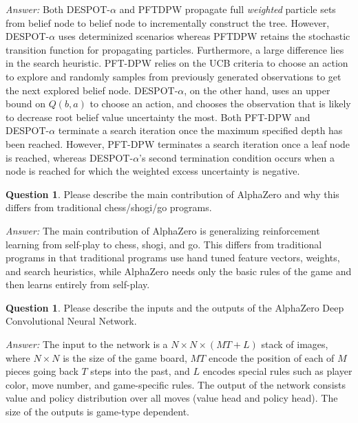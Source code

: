 \documentclass{article}
\theoremstyle{definition}
\newtheorem{question}[thm]{Question}
\newenvironment{answer}{\noindent\textit{Answer:}}{}
\begin{document}
\begin{answer}
Both DESPOT-$\alpha$ and PFTDPW propagate full \emph{weighted} particle sets from belief node to belief node to incrementally construct the tree. However, DESPOT-$\alpha$ uses determinized scenarios whereas PFTDPW retains the stochastic transition function for propagating particles. Furthermore, a large difference lies in the search heuristic. PFT-DPW relies on the UCB criteria to choose an action to explore and randomly samples from previously generated observations to get the next explored belief node. DESPOT-$\alpha$, on the other hand, uses an upper bound on $Q(b,a)$ to choose an action, and chooses the observation that is likely to decrease root belief value uncertainty the most. Both PFT-DPW and DESPOT-$\alpha$ terminate a search iteration once the maximum specified depth has been reached. However, PFT-DPW terminates a search iteration once a leaf node is reached, whereas DESPOT-$\alpha$'s second termination condition occurs when a node is reached for which the weighted excess uncertainty is negative.
\end{answer}

\begin{question}
Please describe the main contribution of AlphaZero and why this differs from traditional chess/shogi/go programs.
\end{question}

\begin{answer}
The main contribution of AlphaZero is generalizing reinforcement learning from self-play to chess, shogi, and go. This differs from traditional programs in that traditional programs use hand tuned feature vectors, weights, and search heuristics, while AlphaZero needs only the basic rules of the game and then learns entirely from self-play.
\end{answer}

\begin{question}
Please describe the inputs and the outputs of the AlphaZero Deep Convolutional Neural Network.
\end{question}

\begin{answer}
The input to the network is a $N \times N \times (MT + L)$ stack of images, where $N \times N$ is the size of the game board, $MT$ encode the position of each of $M$ pieces going back $T$ steps into the past, and $L$ encodes special rules such as player color, move number, and game-specific rules. The output of the network consists value and policy distribution over all moves (value head and policy head). The size of the outputs is game-type dependent.
\end{answer}
\end{document}
